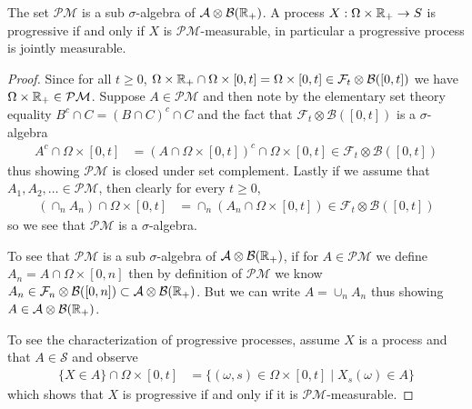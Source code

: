 \begin{lem}The set $\mathcal{P}\mathcal{M}$ is a sub $\sigma$-algebra
  of $\mathcal{A} \otimes \mathcal{B}(\mathbb{R}_+)$.  A process $X :
  \Omega \times \mathbb{R}_+ \to S$ is progressive if and only if $X$ is
  $\mathcal{P}\mathcal{M}$-measurable, in particular a progressive
  process is jointly measurable.
\end{lem}
\begin{proof}
Since for all $t\geq 0$, $\Omega \times \mathbb{R}_+ \cap \Omega \times
[0,t] = \Omega \times [0,t] \in \mathcal{F}_t  \otimes
\mathcal{B}([0,t])$ we have $\Omega \times \mathbb{R}_+ \in
\mathcal{P}\mathcal{M}$.  Suppose $A \in \mathcal{P}\mathcal{M}$ and
then note by the elementary set theory equality $B^c \cap C = (B \cap
C)^c \cap C$ and the fact that $\mathcal{F}_t \otimes
\mathcal{B}([0,t])$ is a $\sigma$-algebra
\begin{align*}
A^c \cap \Omega \times [0,t] &= (A \cap \Omega \times [0,t])^c \cap
\Omega \times [0,t] \in \mathcal{F}_t \otimes \mathcal{B}([0,t])
\end{align*}
thus showing $\mathcal{P}\mathcal{M}$ is closed under set complement.
Lastly if we assume that $A_1, A_2, \dots \in \mathcal{P}\mathcal{M}$,
then clearly  for every $t \geq 0$,
\begin{align*}
\left (\cap_n A_n \right )\cap \Omega \times [0,t] &= \cap_n \left (
  A_n \cap \Omega \times [0,t]\right ) \in \mathcal{F}_t \otimes \mathcal{B}([0,t])
\end{align*}
so we see that $\mathcal{P}\mathcal{M}$ is a $\sigma$-algebra.

To see that $\mathcal{P}\mathcal{M}$ is a sub $\sigma$-algebra of
$\mathcal{A} \otimes \mathcal{B}(\mathbb{R}_+)$, 
if for $A \in \mathcal{P}\mathcal{M}$ we define $A_n = A \cap \Omega
\times [0,n]$ then by definition of $\mathcal{P}\mathcal{M}$ we know
$A_n \in \mathcal{F}_n \otimes \mathcal{B}([0,n]) \subset \mathcal{A}
\otimes \mathcal{B}(\mathbb{R}_+)$.  But we can write $A = \cup_n A_n $
thus showing $A \in \mathcal{A}
\otimes \mathcal{B}(\mathbb{R}_+)$.

To see the characterization of progressive processes, assume $X$ is a
process and that $A
\in \mathcal{S}$ and observe
\begin{align*}
\lbrace X \in A \rbrace \cap \Omega \times [0,t] &= \lbrace (\omega,
s) \in \Omega \times [0,t] \mid X_s(\omega) \in A \rbrace
\end{align*}
which shows that $X$ is progressive if and only if it is $\mathcal{P}\mathcal{M}$-measurable.
\end{proof}
